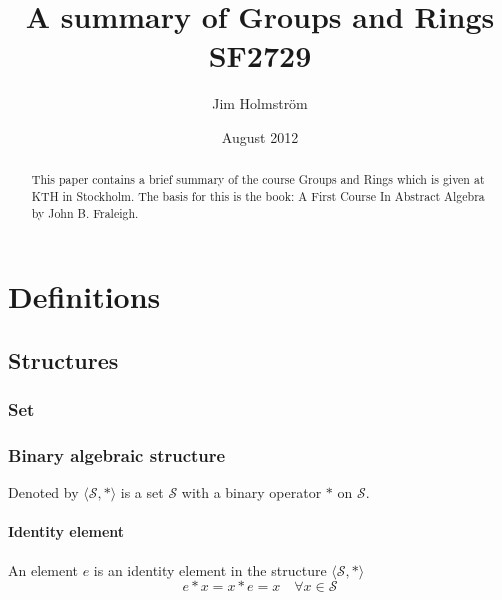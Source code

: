 \documentclass[a4paper,11pt]{kth-mag}
\title{A summary of Groups and Rings SF2729}
\subtitle{}
\author{Jim Holmstr\"{o}m}
\date{August 2012}
\renewcommand{\SS}{\ensuremath{\mathcal{S}}}
\begin{document}
\frontmatter
\pagestyle{empty}
\removepagenumbers
\maketitle
{}
\begin{abstract}
  This paper contains a brief summary of the course Groups and Rings which is
  given at KTH in Stockholm. The basis for this is the book: A First Course In
  Abstract Algebra by John B. Fraleigh.

\end{abstract}
\clearpage
\tableofcontents*
\mainmatter
\pagestyle{newchap}
\chapter{Definitions}

\section{Structures}
\subsection{Set}
\subsection{Binary algebraic structure}
\label{sec:binstructure}
Denoted by $\langle\SS,*\rangle$ is a set $\SS$ with a 
binary operator $*$ on $\SS$. 

\subsubsection{Identity element}
An element $e$ is an identity element in the structure $\langle\SS,*\rangle$
\begin{equation}
   e*x=x*e=x \quad \forall x\in\SS 
\end{equation}
\end{document}

